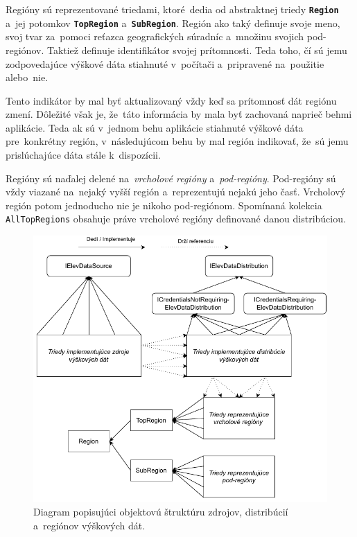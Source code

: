 Regióny sú reprezentované triedami, ktoré~dedia od abstraktnej triedy \textbf{\texttt{Region}} a~jej potomkov \textbf{\texttt{TopRegion}} a~\textbf{\texttt{SubRegion}}. Región ako taký definuje svoje meno, svoj tvar za~pomoci reťazca geografických súradníc a~množinu svojich pod-regiónov. Taktiež definuje identifikátor svojej prítomnosti. Teda toho, čí sú jemu zodpovedajúce výškové dáta stiahnuté v~počítači a~pripravené na~použitie alebo~nie.

Tento indikátor by mal byť aktualizovaný vždy keď sa prítomnosť dát regiónu zmení. Dôležité však je, že~táto informácia by mala byť zachovaná naprieč behmi aplikácie. Teda ak sú v~jednom behu aplikácie stiahnuté výškové dáta pre~konkrétny región, v~následujúcom behu by mal región indikovať, že~sú jemu prislúchajúce dáta stále k~dispozícii.

Regióny sú naďalej delené na~\textit{vrcholové regióny} a~\textit{pod-regióny}. Pod-regióny sú vždy viazané na~nejaký vyšší región a~reprezentujú nejakú jeho časť. Vrcholový región potom jednoducho nie je nikoho pod-regiónom. Spomínaná kolekcia \texttt{AllTopRegions} obsahuje práve vrcholové regióny definované danou distribúciou.    


\begin{figure}[h]\centering
\includegraphics[]{img/vyskove_data_architektura}
\caption{Diagram popisujúci objektovú štruktúru zdrojov, distribúcií a~regiónov výškových dát.} 
\label{obr10:vyskove_data_architektura}
\end{figure}

